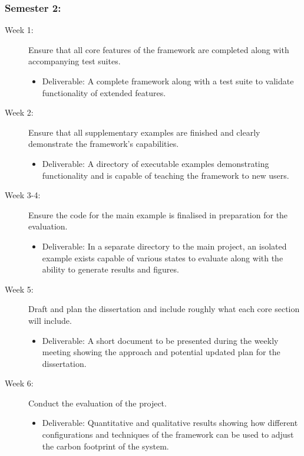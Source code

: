 \documentclass[11pt]{article}
\begin{document}
\subsubsection{Semester 2:}\label{Semester 2}
\begin{description}
  \item[Week 1:] Ensure that all core features of the framework are completed along with accompanying test suites.
    \begin{itemize}
      \item Deliverable: A complete framework along with a test suite to validate functionality of extended features.
    \end{itemize}
\end{description}
\begin{description}
  \item[Week 2:] Ensure that all supplementary examples are finished and clearly demonstrate the framework's capabilities.
    \begin{itemize}
      \item Deliverable: A directory of executable examples demonstrating functionality and is capable of teaching the framework to new users.
    \end{itemize}
\end{description}
\begin{description}
  \item[Week 3-4:] Ensure the code for the main example is finalised in preparation for the evaluation.
    \begin{itemize}
      \item Deliverable: In a separate directory to the main project, an isolated example exists capable of various states to evaluate along with the ability to generate results and figures.
    \end{itemize}
\end{description}
\begin{description}
  \item[Week 5:] Draft and plan the dissertation and include roughly what each core section will include.
    \begin{itemize}
      \item Deliverable: A short document to be presented during the weekly meeting showing the approach and potential updated plan for the dissertation.
    \end{itemize}
\end{description}
\begin{description}
  \item[Week 6:] Conduct the evaluation of the project.
    \begin{itemize}
      \item Deliverable: Quantitative and qualitative results showing how different configurations and techniques of the framework can be used to adjust the carbon footprint of the system.
    \end{itemize}
\end{description}
\end{document}
